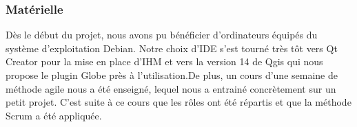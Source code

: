 \subsubsection{Matérielle}
Dès le début du projet, nous avons pu bénéficier d'ordinateurs équipés du système d'exploitation Debian. Notre choix d'IDE s'est tourné très tôt vers Qt Creator pour la mise en place d'IHM et vers la version 14 de Qgis qui nous propose le plugin Globe près à l'utilisation.\vspace{1\baselineskip}De plus, un cours d'une semaine de méthode agile nous a été enseigné, lequel nous a entrainé concrètement sur un petit projet. C'est suite à ce cours que les rôles ont été répartis et que la méthode Scrum a été appliquée.